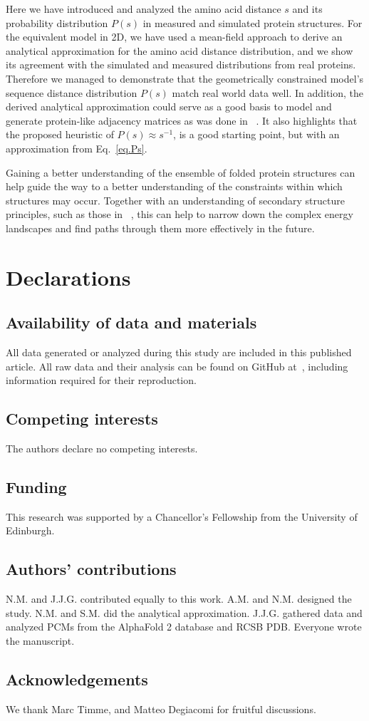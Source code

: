 \documentclass[
reprint,
twocolumn,
amsmath,amssymb,superscriptaddress,aps,
pre]{revtex4-1}
\begin{document}
Here we have introduced and analyzed the amino acid distance $s$ and its probability distribution $P(s)$ in measured and simulated protein structures. For the equivalent model in 2D, we have used a mean-field approach to derive an analytical approximation for the amino acid distance distribution, and we show its agreement with the simulated and measured distributions from real proteins.
Therefore we managed to demonstrate that the geometrically constrained model's sequence distance distribution $P(s)$ match real world data well. In addition, the derived analytical approximation could serve as a good basis to model and generate protein-like adjacency matrices as was done in ~\cite{bartoli2008effecta}. It also highlights that the proposed heuristic of $P(s)\approx s^{-1}$, is a good starting point, but with an  approximation from Eq.~\ref{eq.Ps}.

Gaining a better understanding of the ensemble of folded protein structures can help guide the way to a better understanding of the constraints within which structures may occur. Together with an understanding of secondary structure principles, such as those in
~\cite{Danielsson2010, Molkenthin2011}, this can help to narrow down the complex energy landscapes and find paths through them more effectively in the future.

\section*{Declarations}
\subsection{Availability of data and materials}
All data generated or analyzed during this study are included in this published article. All raw data and their analysis can be found on GitHub at~\cite{2022sequence}, including information required for their reproduction. 
\subsection{Competing interests}
The authors declare no competing interests.
\subsection{Funding}
This research was supported by a Chancellor's Fellowship from the University of Edinburgh. 
\subsection{Authors' contributions}
N.M. and J.J.G. contributed equally to this work. A.M. and N.M. designed the study. N.M. and S.M. did the analytical approximation. J.J.G. gathered data and analyzed PCMs from the AlphaFold 2 database and RCSB PDB. Everyone wrote the manuscript. 
\subsection{Acknowledgements}
We thank Marc Timme, and Matteo Degiacomi for fruitful discussions.



\end{document}
